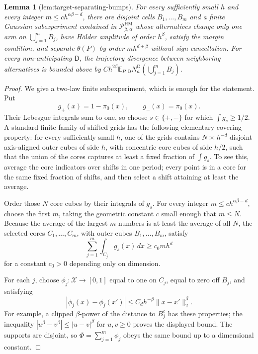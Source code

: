 \documentclass{article}
\newtheorem{lemma}{Lemma}
\begin{document}
\begin{lemma}[lem:target-separating-bumps]\label{lem:target-separating-bumps}
For every sufficiently small \(h\) and every integer \(m\le c h^{\alpha\beta-d}\), there are disjoint cells \(B_1,\ldots,B_m\) and a finite Gaussian subexperiment contained in \(\mathcal P_{\beta,\alpha}^{\mathrm{HM}}\) whose alternatives change only one arm on \(\bigcup_{j=1}^mB_j\), have Hölder amplitude of order \(h^\beta\), satisfy the margin condition, and separate \(\theta(P)\) by order \(m h^{d+\beta}\) without sign cancellation. For every non-anticipating \(\mathsf D\), the trajectory divergence between neighboring alternatives is bounded above by \(C h^{2\beta}\mathbb E_{P,\mathsf D}N_a^{\mathsf D}(\bigcup_{j=1}^mB_j)\).
\end{lemma}
\begin{proof}
We give a two-law finite subexperiment, which is enough for the statement.  Put
\[
g_+(x)=1-\pi_0(x),\qquad g_-(x)=\pi_0(x).
\]
Their Lebesgue integrals sum to one, so choose \(s\in\{+,-\}\) for which \(\int g_s\geq1/2\).  A standard finite family of shifted grids has the following elementary covering property: for every sufficiently small \(h\), one of the grids contains \(N\asymp h^{-d}\) disjoint axis-aligned outer cubes of side \(h\), with concentric core cubes of side \(h/2\), such that the union of the cores captures at least a fixed fraction of \(\int g_s\).  To see this, average the core indicators over shifts in one period; every point is in a core for the same fixed fraction of shifts, and then select a shift attaining at least the average.

Order those \(N\) core cubes by their integrals of \(g_s\).  For every integer \(m\leq c h^{\alpha\beta-d}\), choose the first \(m\), taking the geometric constant \(c\) small enough that \(m\leq N\).  Because the average of the largest \(m\) numbers is at least the average of all \(N\), the selected cores \(C_1,\ldots,C_m\), with outer cubes \(B_1,\ldots,B_m\), satisfy
\[
\sum_{j=1}^m\int_{C_j}g_s(x)\,dx\geq c_0mh^d
\]
for a constant \(c_0>0\) depending only on dimension.

For each \(j\), choose \(\phi_j:\mathcal X\to[0,1]\) equal to one on \(C_j\), equal to zero off \(B_j\), and satisfying
\[
|\phi_j(x)-\phi_j(x')|\leq C_dh^{-\beta}\|x-x'\|_2^\beta.
\]
For example, a clipped \(\beta\)-power of the distance to \(B_j^c\) has these properties; the inequality \(|u^\beta-v^\beta|\leq|u-v|^\beta\) for \(u,v\geq0\) proves the displayed bound.  The supports are disjoint, so \(\Phi=\sum_{j=1}^m\phi_j\) obeys the same bound up to a dimensional constant.


\end{proof}
\end{document}
